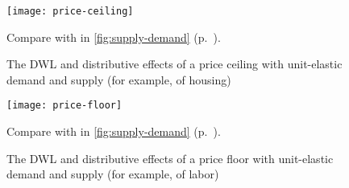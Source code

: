 \begin{figure}[htbp]
	\begin{center}
	\texttt{[image: price-ceiling]}  
	\caption[Efficiency and Equity of a Price Ceiling]{The \gls{DWL} and distributive effects of a price ceiling with unit-elastic demand and supply (for example, of housing)}	
	\end{center}
	\scriptsize{Compare with  in \autoref{fig:supply-demand} (p.~\pageref{fig:supply-demand}).}
	\label{fig:price-ceiling}
\end{figure}

\begin{figure}[htbp]
	\begin{center}
	\texttt{[image: price-floor]}  
	\caption[Efficiency and Equity of a Price Floor]{The \gls{DWL} and distributive effects of a price floor with unit-elastic demand and supply (for example, of labor)}
	\end{center}
	\scriptsize{Compare with  in \autoref{fig:supply-demand} (p.~\pageref{fig:supply-demand}).}
	\label{fig:price-floor}
\end{figure}

